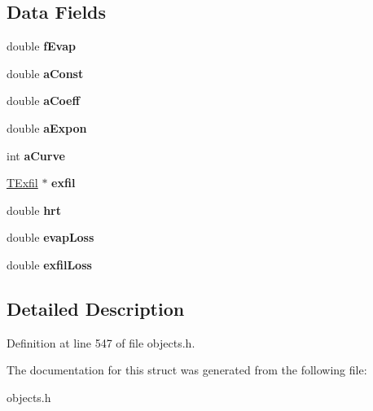 \subsection*{Data Fields}
\begin{DoxyCompactItemize}
\item 
\mbox{\label{struct_t_storage_acdbea33bcf01c0741cced07bf55bc649}} 
double {\bfseries f\+Evap}
\item 
\mbox{\label{struct_t_storage_ad7763382fdf4b625a3c4009a96acd6e6}} 
double {\bfseries a\+Const}
\item 
\mbox{\label{struct_t_storage_a0e73ad574be4aff3503f3f4a7a7dabf8}} 
double {\bfseries a\+Coeff}
\item 
\mbox{\label{struct_t_storage_a27a64a6414f4df295c03fc6108c55f7d}} 
double {\bfseries a\+Expon}
\item 
\mbox{\label{struct_t_storage_afe9922d753255c1df51e835c19686e79}} 
int {\bfseries a\+Curve}
\item 
\mbox{\label{struct_t_storage_a8213500f20a0f536c415bbefe6cd32f1}} 
\hyperlink{struct_t_exfil}{T\+Exfil} $\ast$ {\bfseries exfil}
\item 
\mbox{\label{struct_t_storage_a89e3861ed4ede9839eaa1f6ce9d4e5a2}} 
double {\bfseries hrt}
\item 
\mbox{\label{struct_t_storage_a3bd47dbb068d3930a0c69000be666399}} 
double {\bfseries evap\+Loss}
\item 
\mbox{\label{struct_t_storage_a921d2b1bd0a9cb43351e10e34eb6c38f}} 
double {\bfseries exfil\+Loss}
\end{DoxyCompactItemize}


\subsection{Detailed Description}


Definition at line 547 of file objects.\+h.



The documentation for this struct was generated from the following file\+:\begin{DoxyCompactItemize}
\item 
objects.\+h\end{DoxyCompactItemize}
